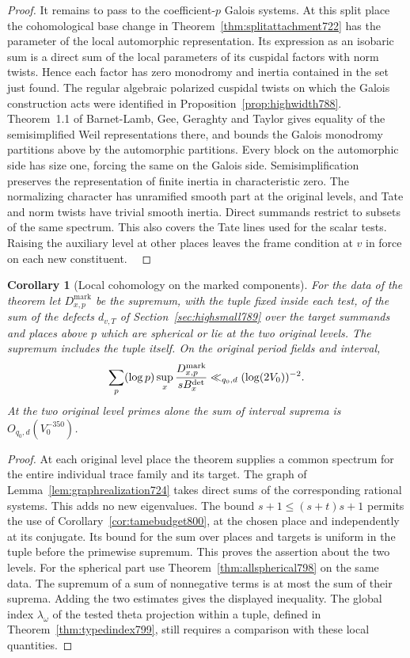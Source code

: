 \documentclass[a4paper,11pt]{article}
\newtheorem{corollary}[proposition]{Corollary}
\theoremstyle{definition}
\theoremstyle{remark}
\numberwithin{equation}{section}
\begin{document}
\begin{proof}
It remains to pass to the coefficient-\(p\) Galois systems.
At this split place the cohomological base change in
Theorem~\ref{thm:splitattachment722} has the parameter of the
local automorphic representation. Its expression as an isobaric
sum is a direct sum of the local parameters of its cuspidal factors
with norm twists. Hence each factor has zero monodromy and inertia
contained in the set just found. The regular algebraic polarized
cuspidal twists on which the Galois construction acts were
identified in Proposition~\ref{prop:highwidth788}.
Theorem~1.1 of Barnet-Lamb, Gee, Geraghty and Taylor gives equality
of the semisimplified Weil representations there, and bounds the
Galois monodromy partitions above by the automorphic partitions.
Every block on the automorphic side has size one, forcing the
same on the Galois side. Semisimplification preserves the
representation of finite inertia in characteristic zero.
The normalizing character has unramified smooth part at the
original levels, and Tate and norm twists have trivial smooth
inertia. Direct summands restrict to subsets of the same
spectrum. This also covers the Tate lines used for the scalar
tests. Raising the auxiliary level at other places leaves the
frame condition at \(v\) in force on each new constituent.
~\cite[Thm.~1.1]{III-II-blggttame743}
\end{proof}

\begin{corollary}[Local cohomology on the marked components]
\leavevmode\label{cor:markedlocal801}
For the data of the theorem let \(D^{\mathrm{mark}}_{x,p}\) be
the supremum, with the tuple fixed inside each test, of the sum
of the defects \(d_{v,T}\) of Section~\ref{sec:highsmall789}
over the target summands and places above \(p\) which are spherical
or lie at the two original levels. The supremum includes the tuple
itself. On the original period fields and interval,
\[
       \sum_p(\log p)\sup_x
            \frac{D^{\mathrm{mark}}_{x,p}}{sB_x^{\rm det}}
                  \ll_{q_0,d}(\log(2V_0))^{-2}.
\]
At the two original level primes alone the sum of interval
suprema is \(O_{q_0,d}(V_0^{-350})\).
\end{corollary}
\begin{proof}
At each original level place the theorem supplies a common
spectrum for the entire individual trace family and its target.
The graph of Lemma~\ref{lem:graphrealization724} takes direct
sums of the corresponding rational systems. This adds no new
eigenvalues. The bound \(s+1\le(s+t)s+1\) permits the use of
Corollary~\ref{cor:tamebudget800}, at the chosen place and
independently at its conjugate. Its bound for the sum over
places and targets is uniform in the tuple before the
primewise supremum. This proves the assertion about the two
levels. For the spherical part use
Theorem~\ref{thm:allspherical798} on the same data.
The supremum of a sum of nonnegative terms is at most the
sum of their suprema. Adding the two estimates gives the
displayed inequality. The global index \(\lambda_\omega\)
of the tested theta projection within a tuple, defined in
Theorem~\ref{thm:typedindex799}, still requires a comparison
with these local quantities.
\end{proof}
\clearpage
\end{document}
